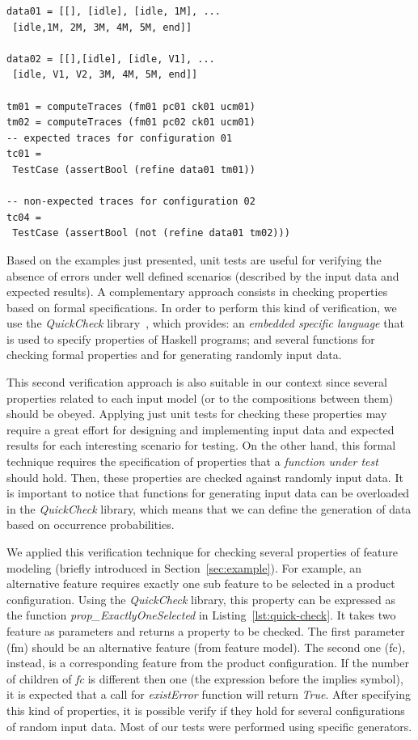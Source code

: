 \documentclass{acm_proc_article-sp}
\begin{document}
{\begin{lstlisting}[belowskip=10pt,frame=tb,caption={Unit test for composition process},label=lst:unitTest]
data01 = [[], [idle], [idle, 1M], ...
 [idle,1M, 2M, 3M, 4M, 5M, end]]

data02 = [[],[idle], [idle, V1], ...
 [idle, V1, V2, 3M, 4M, 5M, end]]

tm01 = computeTraces (fm01 pc01 ck01 ucm01)
tm02 = computeTraces (fm01 pc02 ck01 ucm01)
-- expected traces for configuration 01
tc01 = 
 TestCase (assertBool (refine data01 tm01))

-- non-expected traces for configuration 02
tc04 = 
 TestCase (assertBool (not (refine data01 tm02)))
\end{lstlisting}

Based on the examples just presented, unit tests are useful for 
verifying the absence of errors under well defined scenarios 
(described by the input data and expected results). A complementary 
approach consists in checking properties based on formal 
specifications. In order to perform this kind of verification, we use 
the \emph{QuickCheck} library~\cite{claessen00-icfp-2000}, which provides: 
an \emph{embedded specific language} that is used to specify 
properties of Haskell programs; and several functions for checking 
formal properties and for generating randomly input data. 

This second verification approach is also suitable in our context since 
several properties related to each input model (or to the compositions between them) 
should be obeyed. Applying just unit tests for checking these properties may 
require a great effort for designing and implementing input data and expected results 
for each interesting scenario for testing. On the other hand, this formal technique 
requires the specification of properties that a \emph{function under test} 
should hold. Then, these properties are checked against randomly input data. It is important 
to notice that functions for generating input data can be overloaded in the \emph{QuickCheck} 
library, which means that we can define the generation of data based on occurrence probabilities.

We applied this verification technique for checking several properties of feature modeling (briefly introduced in Section~\ref{sec:example}). For example, an alternative feature requires exactly one sub feature to be selected in a product configuration. Using the \emph{QuickCheck} library, this property can be expressed as the function \emph{prop\_ExactlyOneSelected} in Listing~\ref{lst:quick-check}. 
It takes two feature as parameters and returns a property to be checked. The first parameter (fm) should be an alternative feature (from feature model). The second one (fc), instead, is a corresponding feature from the product configuration. If the number of children of \emph{fc} is different then one (the expression before the implies symbol), it is expected that a call for \emph{existError} function will return \emph{True}. After specifying this kind of properties, it is possible verify if they hold for several configurations of random input data. Most of our tests were performed using specific generators.      

}
\end{document}
